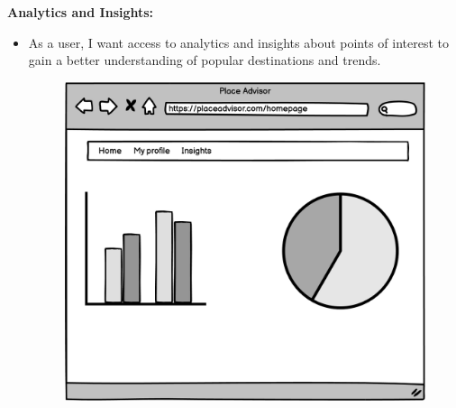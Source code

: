 \documentclass[../main.tex]{subfiles}
\begin{document}
\textbf{Analytics and Insights:}
\begin{itemize}
  \item As a user, I want access to analytics and insights about points of interest to gain a better understanding of popular destinations and trends.
  \begin{figure}[H]
	\centering
	\label{fig:pngegg}
	\includegraphics[width=0.5\linewidth]{../figures/mockup/US9.png}
  \end{figure}
\end{itemize}

\pagebreak
\end{document}

